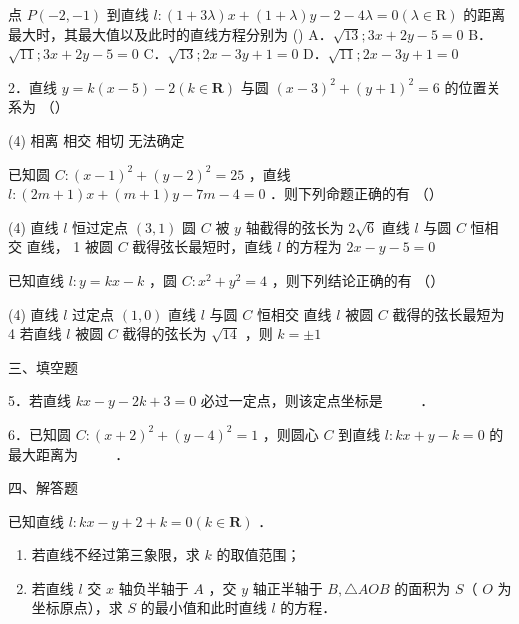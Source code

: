 
\begin{example}
    点 $P(-2,-1)$ 到直线 $l:(1+3 \lambda) x+(1+\lambda) y-2-4 \lambda=0(\lambda \in \mathrm{R})$ 的距离最大时，其最大值以及此时的直线方程分别为 ()
    A．$\sqrt{13} ; 3 x+2 y-5=0$
    B．$\sqrt{11} ; 3 x+2 y-5=0$
    C．$\sqrt{13} ; 2 x-3 y+1=0$
    D．$\sqrt{11} ; 2 x-3 y+1=0$

    2．直线 $y=k(x-5)-2(k \in \mathbf{R})$ 与圆 $(x-3)^2+(y+1)^2=6$ 的位置关系为 （\qquad）
    \begin{tasks}(4)
        \task 相离
        \task 相交
        \task 相切
        \task 无法确定
    \end{tasks}
\end{example}

\begin{example}
    已知圆 $C:(x-1)^2+(y-2)^2=25$ ，直线 $l:(2 m+1) x+(m+1) y-7 m-4=0$ ．则下列命题正确的有 （\qquad）
    \begin{tasks}(4)
        \task 直线 $l$ 恒过定点 $(3,1)$
        \task 圆 $C$ 被 $y$ 轴截得的弦长为 $2 \sqrt{6}$
        \task 直线 $l$ 与圆 $C$ 恒相交
        \task 直线， 1 被圆 $C$ 截得弦长最短时，直线 $l$ 的方程为 $2 x-y-5=0$
    \end{tasks}
\end{example}
\begin{example}
    已知直线 $l: y=k x-k$ ，圆 $C: x^2+y^2=4$ ，则下列结论正确的有 （\qquad）
    \begin{tasks}(4)
        \task 直线 $l$ 过定点 $(1,0)$
        \task 直线 $l$ 与圆 $C$ 恒相交
        \task 直线 $l$ 被圆 $C$ 截得的弦长最短为 4
        \task 若直线 $l$ 被圆 $C$ 截得的弦长为 $\sqrt{14}$ ，则 $k= \pm 1$
    \end{tasks}
\end{example}
三、填空题

5．若直线 $k x-y-2 k+3=0$ 必过一定点，则该定点坐标是 $\qquad$ ．

6．已知圆 $C:(x+2)^2+(y-4)^2=1$ ，则圆心 $C$ 到直线 $l: k x+y-k=0$ 的最大距离为 $\qquad$ ．

四、解答题

\begin{example}
    已知直线 $l: k x-y+2+k=0(k \in \mathbf{R})$ ．
    \begin{enumerate}
        \item 若直线不经过第三象限，求 $k$ 的取值范围；

        \item 若直线 $l$ 交 $x$ 轴负半轴于 $A$ ，交 $y$ 轴正半轴于 $B, \triangle A O B$ 的面积为 $S$（ $O$ 为坐标原点），求 $S$ 的最小值和此时直线 $l$ 的方程．
    \end{enumerate}
\end{example}

